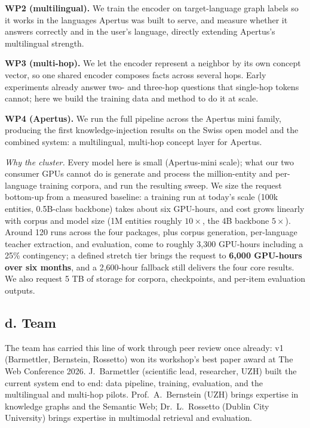 \documentclass[11pt,a4paper]{article}
\begin{document}
\textbf{WP2 (multilingual).} We train the encoder on target-language graph labels so it works in
the languages Apertus was built to serve, and measure whether it answers correctly and in the
user's language, directly extending Apertus's multilingual strength.

\textbf{WP3 (multi-hop).} We let the encoder represent a neighbor by its own concept vector, so
one shared encoder composes facts across several hops. Early experiments already answer two- and
three-hop questions that single-hop tokens cannot; here we build the training data and method to
do it at scale.

\textbf{WP4 (Apertus).} We run the full pipeline across the Apertus mini family, producing the
first knowledge-injection results on the Swiss open model and the combined system: a multilingual,
multi-hop concept layer for Apertus.

\emph{Why the cluster.} Every model here is small (Apertus-mini scale); what our two consumer GPUs
cannot do is generate and process the million-entity and per-language training corpora, and run
the resulting sweep. We size the request bottom-up from a measured baseline: a training run at
today's scale (100k entities, 0.5B-class backbone) takes about six GPU-hours, and cost grows
linearly with corpus and model size (1M entities roughly $10\times$, the 4B backbone
$5\times$). Around 120 runs across the four packages, plus corpus generation, per-language
teacher extraction, and evaluation, come to roughly 3{,}300 GPU-hours including a 25\%
contingency; a defined stretch tier brings the request to \textbf{6{,}000 GPU-hours over six
months}, and a 2{,}600-hour fallback still delivers the four core results. We also request
5 TB of storage for corpora, checkpoints, and per-item evaluation outputs.

\subsection*{d. Team}
The team has carried this line of work through peer review once already: v1 \cite{cfv1}
(Barmettler, Bernstein, Rossetto) won its workshop's best paper award at The Web Conference 2026.
J.~Barmettler (scientific lead, researcher, UZH) built the current system end to end: data
pipeline, training, evaluation, and the multilingual and multi-hop pilots. Prof.~A.~Bernstein
(UZH) brings expertise in knowledge graphs and the Semantic Web; Dr.~L.~Rossetto (Dublin City
University) brings expertise in multimodal retrieval and evaluation.
\end{document}
